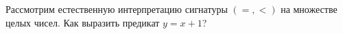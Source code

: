 Рассмотрим естественную интерпретацию сигнатуры $(=, <)$ на множестве целых чисел. Как выразить предикат $y = x + 1$?
